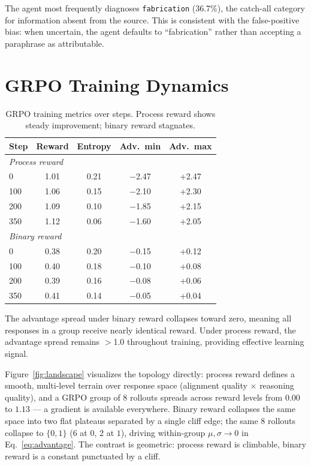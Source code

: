 \documentclass{article}
\begin{document}
The agent most frequently diagnoses \texttt{fabrication} (36.7\%), the catch-all category for information absent from the source.
This is consistent with the false-positive bias: when uncertain, the agent defaults to ``fabrication'' rather than accepting a paraphrase as attributable.


\section{GRPO Training Dynamics}
\label{app:dynamics}

\begin{table}[h]
\centering
\small
\caption{GRPO training metrics over steps. Process reward shows steady improvement; binary reward stagnates.}
\label{tab:dynamics_full}
\begin{tabular}{lcccc}
\toprule
\textbf{Step} & \textbf{Reward} & \textbf{Entropy} & \textbf{Adv.\ min} & \textbf{Adv.\ max} \\
\midrule
\multicolumn{5}{l}{\textit{Process reward}} \\
0 & 1.01 & 0.21 & $-$2.47 & +2.47 \\
100 & 1.06 & 0.15 & $-$2.10 & +2.30 \\
200 & 1.09 & 0.10 & $-$1.85 & +2.15 \\
350 & 1.12 & 0.06 & $-$1.60 & +2.05 \\
\midrule
\multicolumn{5}{l}{\textit{Binary reward}} \\
0 & 0.38 & 0.20 & $-$0.15 & +0.12 \\
100 & 0.40 & 0.18 & $-$0.10 & +0.08 \\
200 & 0.39 & 0.16 & $-$0.08 & +0.06 \\
350 & 0.41 & 0.14 & $-$0.05 & +0.04 \\
\bottomrule
\end{tabular}
\end{table}

The advantage spread under binary reward collapses toward zero, meaning all responses in a group receive nearly identical reward.
Under process reward, the advantage spread remains $>$1.0 throughout training, providing effective learning signal.

Figure~\ref{fig:landscape} visualizes the topology directly: process reward defines a smooth, multi-level terrain over response space (alignment quality $\times$ reasoning quality), and a GRPO group of 8 rollouts spreads across reward levels from $0.00$ to $1.13$ --- a gradient is available everywhere.
Binary reward collapses the same space into two flat plateaus separated by a single cliff edge; the same 8 rollouts collapse to $\{0, 1\}$ (6 at $0$, 2 at $1$), driving within-group $\mu, \sigma \to 0$ in Eq.~\ref{eq:advantage}.
The contrast is geometric: process reward is climbable, binary reward is a constant punctuated by a cliff.
\end{document}
